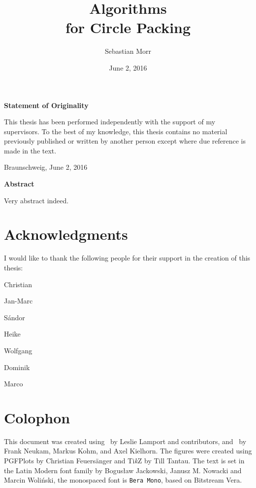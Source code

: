 \documentclass[a4paper,style=print,bibliography=totoc,nexus,lnum,extramargin]{tubsbook}
\title{Algorithms \\for Circle Packing}
\author{\sffamily\LARGE Sebastian Morr}
\date{\large June 2, 2016}
\begin{document}
\frontmatter %

\maketitle
\cleardoublepage

\thispagestyle{plain} %
\vspace*{7cm}
\centerline{\bfseries Statement of Originality}
\vspace*{1em}
\noindent
This thesis has been performed independently with the support of my supervisors.
To the best of my knowledge, this thesis contains no material previously
published or written by another person except where due reference is made in the text.

\par
  \bigskip\noindent Braunschweig, June 2, 2016 \par
  \vspace*{10mm}
  \hfill\hrulefill
\cleardoublepage

\thispagestyle{plain} %
\centerline{\bfseries Abstract}
\vspace*{1em}
\noindent
Very abstract indeed.
\cleardoublepage

\section*{Acknowledgments}

I would like to thank the following people for their support in the creation of this thesis:

Christian

Jan-Marc

Sándor

Heike

Wolfgang

Dominik

Marco

\section*{Colophon}

This document was created using \LaTeXe\ by Leslie Lamport and contributors, and \KOMAScript\ by Frank Neukam, Markus Kohm, and Axel Kielhorn. The figures were created using PGFPlots by Christian Feuersänger and Ti\textit{k}Z by Till Tantau. The text is set in the Latin Modern font family by Bogusław Jackowski, Janusz M. Nowacki and Marcin Woliński, the monospaced font is \texttt{Bera Mono}, based on Bitstream Vera.
\end{document}
